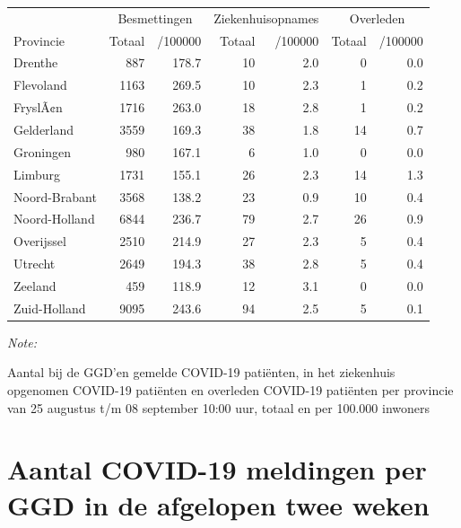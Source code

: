 \documentclass[
  english,
  man,floatsintext]{apa6}
\begin{document}
\begin{table}
\centering
\begin{threeparttable}
\begin{tabular}{lrrrrrr}
\toprule
\multicolumn{1}{c}{ } & \multicolumn{2}{c}{Besmettingen} & \multicolumn{2}{c}{Ziekenhuisopnames} & \multicolumn{2}{c}{Overleden} \\
\cmidrule(l{3pt}r{3pt}){2-3} \cmidrule(l{3pt}r{3pt}){4-5} \cmidrule(l{3pt}r{3pt}){6-7}
Provincie & Totaal & /100000 & Totaal & /100000 & Totaal & /100000\\
\midrule
Drenthe & 887 & 178.7 & 10 & 2.0 & 0 & 0.0\\
Flevoland & 1163 & 269.5 & 10 & 2.3 & 1 & 0.2\\
FryslÃ¢n & 1716 & 263.0 & 18 & 2.8 & 1 & 0.2\\
Gelderland & 3559 & 169.3 & 38 & 1.8 & 14 & 0.7\\
Groningen & 980 & 167.1 & 6 & 1.0 & 0 & 0.0\\
Limburg & 1731 & 155.1 & 26 & 2.3 & 14 & 1.3\\
Noord-Brabant & 3568 & 138.2 & 23 & 0.9 & 10 & 0.4\\
Noord-Holland & 6844 & 236.7 & 79 & 2.7 & 26 & 0.9\\
Overijssel & 2510 & 214.9 & 27 & 2.3 & 5 & 0.4\\
Utrecht & 2649 & 194.3 & 38 & 2.8 & 5 & 0.4\\
Zeeland & 459 & 118.9 & 12 & 3.1 & 0 & 0.0\\
Zuid-Holland & 9095 & 243.6 & 94 & 2.5 & 5 & 0.1\\
\bottomrule
\end{tabular}
\begin{tablenotes}
\item \textit{Note: } 
\item Aantal bij de GGD’en gemelde COVID-19 patiënten, in het ziekenhuis opgenomen COVID-19 patiënten en overleden COVID-19 patiënten per provincie van 25 augustus t/m 08 september 10:00 uur, totaal en per 100.000 inwoners
\end{tablenotes}
\end{threeparttable}
\end{table}

\newpage

\hypertarget{aantal-covid-19-meldingen-per-ggd-in-de-afgelopen-twee-weken}{%
\section{Aantal COVID-19 meldingen per GGD in de afgelopen twee weken}\label{aantal-covid-19-meldingen-per-ggd-in-de-afgelopen-twee-weken}}
\end{document}
